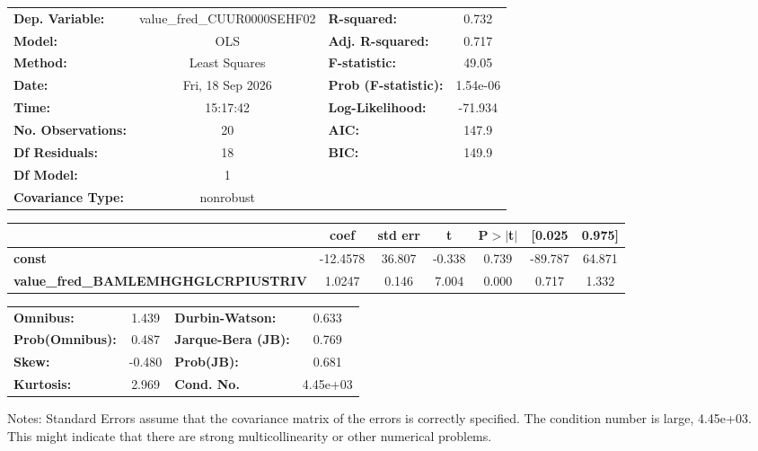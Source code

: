 \begin{center}
\begin{tabular}{lclc}
\toprule
\textbf{Dep. Variable:}                     & value\_fred\_CUUR0000SEHF02 & \textbf{  R-squared:         } &     0.732   \\
\textbf{Model:}                             &             OLS             & \textbf{  Adj. R-squared:    } &     0.717   \\
\textbf{Method:}                            &        Least Squares        & \textbf{  F-statistic:       } &     49.05   \\
\textbf{Date:}                              &       Fri, 18 Sep 2026      & \textbf{  Prob (F-statistic):} &  1.54e-06   \\
\textbf{Time:}                              &           15:17:42          & \textbf{  Log-Likelihood:    } &   -71.934   \\
\textbf{No. Observations:}                  &                20           & \textbf{  AIC:               } &     147.9   \\
\textbf{Df Residuals:}                      &                18           & \textbf{  BIC:               } &     149.9   \\
\textbf{Df Model:}                          &                 1           & \textbf{                     } &             \\
\textbf{Covariance Type:}                   &          nonrobust          & \textbf{                     } &             \\
\bottomrule
\end{tabular}
\begin{tabular}{lcccccc}
                                            & \textbf{coef} & \textbf{std err} & \textbf{t} & \textbf{P$> |$t$|$} & \textbf{[0.025} & \textbf{0.975]}  \\
\midrule
\textbf{const}                              &     -12.4578  &       36.807     &    -0.338  &         0.739        &      -89.787    &       64.871     \\
\textbf{value\_fred\_BAMLEMHGHGLCRPIUSTRIV} &       1.0247  &        0.146     &     7.004  &         0.000        &        0.717    &        1.332     \\
\bottomrule
\end{tabular}
\begin{tabular}{lclc}
\textbf{Omnibus:}       &  1.439 & \textbf{  Durbin-Watson:     } &    0.633  \\
\textbf{Prob(Omnibus):} &  0.487 & \textbf{  Jarque-Bera (JB):  } &    0.769  \\
\textbf{Skew:}          & -0.480 & \textbf{  Prob(JB):          } &    0.681  \\
\textbf{Kurtosis:}      &  2.969 & \textbf{  Cond. No.          } & 4.45e+03  \\
\bottomrule
\end{tabular}
\end{center}

Notes: \newline
 [1] Standard Errors assume that the covariance matrix of the errors is correctly specified. \newline
 [2] The condition number is large, 4.45e+03. This might indicate that there are \newline
 strong multicollinearity or other numerical problems.